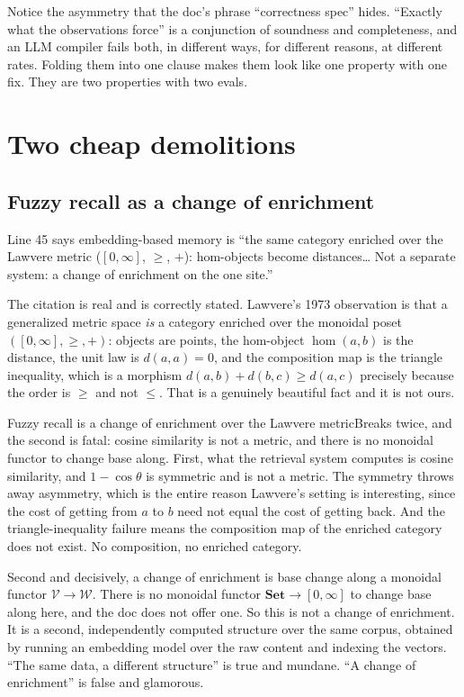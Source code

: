 Notice the asymmetry that the doc's phrase ``correctness spec'' hides. ``Exactly what the observations force'' is a conjunction of soundness and completeness, and an LLM compiler fails both, in different ways, for different reasons, at different rates. Folding them into one clause makes them look like one property with one fix. They are two properties with two evals.

\section{Two cheap demolitions}

\subsection*{Fuzzy recall as a change of enrichment}

Line 45 says embedding-based memory is ``the same category enriched over the Lawvere metric ($[0,\infty]$, $\geq$, $+$): hom-objects become distances\ldots{} Not a separate system: a change of enrichment on the one site.''

The citation is real and is correctly stated. Lawvere's 1973 observation is that a generalized metric space \emph{is} a category enriched over the monoidal poset $([0,\infty], \geq, +)$: objects are points, the hom-object $\hom(a,b)$ is the distance, the unit law is $d(a,a) = 0$, and the composition map is the triangle inequality, which is a morphism $d(a,b) + d(b,c) \geq d(a,c)$ precisely because the order is $\geq$ and not $\leq$. That is a genuinely beautiful fact and it is not ours.

\begin{Analogy}{Fuzzy recall is a change of enrichment over the Lawvere metric}{Breaks twice, and the second is fatal: cosine similarity is not a metric, and there is no monoidal functor to change base along.}
First, what the retrieval system computes is cosine similarity, and $1 - \cos\theta$ is symmetric and is not a metric. The symmetry throws away asymmetry, which is the entire reason Lawvere's setting is interesting, since the cost of getting from $a$ to $b$ need not equal the cost of getting back. And the triangle-inequality failure means the composition map of the enriched category does not exist. No composition, no enriched category.

Second and decisively, a change of enrichment is base change along a monoidal functor $\mathcal{V} \to \mathcal{W}$. There is no monoidal functor $\mathbf{Set} \to [0,\infty]$ to change base along here, and the doc does not offer one. So this is not a change of enrichment. It is a second, independently computed structure over the same corpus, obtained by running an embedding model over the raw content and indexing the vectors. ``The same data, a different structure'' is true and mundane. ``A change of enrichment'' is false and glamorous.
\end{Analogy}

